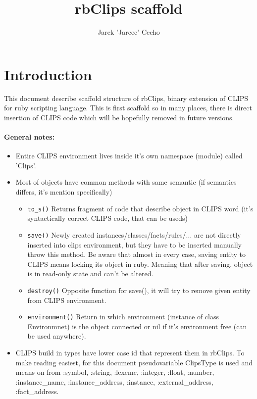 \documentclass[a4paper,10pt]{article}
\title{rbClips scaffold}
\author{Jarek 'Jarcec' Cecho}
\begin{document}
\maketitle
\tableofcontents

\section{Introduction}
This document describe scaffold structure of rbClips, binary extension of CLIPS for ruby scripting language. This is first scaffold so in many places, there is direct insertion of CLIPS code which will be hopefully removed in future versions.

\paragraph{General notes:}
\begin{itemize}
 \item Entire CLIPS environment lives inside it's own namespace (module) called 'Clips'.
 \item Most of objects have common methods with same semantic (if semantics differs, it's mention specifically)
	\begin{itemize}
	 \item \texttt{to\_s()} Returns fragment of code that describe object in CLIPS word (it's syntactically correct CLIPS code, that can be useds)
	 \item \texttt{save()} Newly created instances/classes/facts/rules/... are not directly inserted into clips environment, but they have to be inserted manually throw this method. Be aware that almost in every case, saving entity to CLIPS means locking its object in ruby. Meaning that after saving, object is in read-only state and can't be altered.
	 \item \texttt{destroy()} Opposite function for save(), it will try to remove given entity from CLIPS environment.
	 \item \texttt{environment()} Return in which environment (instance of class Environmnet) is the object connected or nil if it's environment free (can be used anywhere).
	\end{itemize}
 \item CLIPS build in types have lower case id that represent them in rbClips. To make reading easiest, for this document pseudovariable ClipsType is used and means on from :symbol, :string, :lexeme, :integer, :float, :number, :instance\_name, :instance\_address, :instance, :external\_address, :fact\_address.
\end{itemize}
\end{document}
